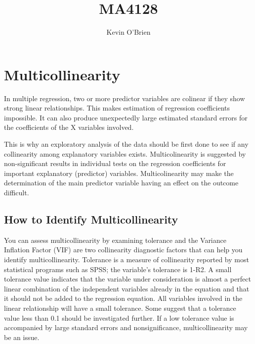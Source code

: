 \documentclass[12pt]{article}
\title{MA4128}
\author{Kevin O'Brien}
\begin{document}
\section{Multicollinearity}
In multiple regression, two or more predictor variables are colinear if they show strong linear relationships. This makes estimation of regression coefficients impossible. It can also produce unexpectedly large estimated standard errors for the coefficients of the X variables involved.

This is why an exploratory analysis of the data should be first done to see if any collinearity among explanatory variables exists. Multicolinearity is suggested by non-significant results in individual tests on the regression coefficients for important explanatory (predictor) variables. Multicolinearity may make the determination of the main predictor variable having an effect on the outcome difficult.

\subsection{How to Identify Multicollinearity}

You can assess multicollinearity by examining tolerance and the Variance Inflation Factor (VIF) are two collinearity diagnostic factors that can help you identify multicollinearity. Tolerance is a measure of collinearity reported by most statistical programs such as SPSS; the variable’s tolerance is 1-R2. A small tolerance value indicates that the variable under consideration is almost a perfect linear combination of the independent variables already in the equation and that it should not be added to the regression equation. All variables involved in the linear relationship will have a small tolerance. Some suggest that a tolerance value less than 0.1 should be investigated further. If a low tolerance value is accompanied by large standard errors and nonsignificance, multicollinearity may be an issue.
%
%
\end{document}
